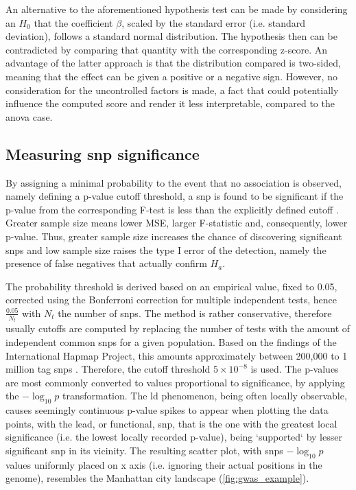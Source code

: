 An alternative to the aforementioned hypothesis test can be made by considering an $H_0$ that the coefficient $\beta$,  scaled by the standard error (i.e. standard deviation), follows a standard normal distribution. The hypothesis then can be contradicted by comparing that quantity with the corresponding z-score. An advantage of the latter approach is that the distribution compared is two-sided, meaning that the effect can be given a positive or a negative sign. However, no consideration for the uncontrolled factors is made, a fact that could potentially influence the computed score and render it less interpretable, compared to the \ac{anova} case.

\subsection{Measuring \ac{snp} significance}

By assigning a minimal probability to the event that no association is observed, namely defining a p-value cutoff threshold, a \ac{snp} is found to be significant if the p-value from the corresponding F-test is less than the explicitly defined cutoff \cite{AlejandroGonzalez-Chica2015}. Greater sample size means lower MSE, larger F-statistic and, consequently, lower p-value. Thus, greater sample size increases the chance of discovering significant \acp{snp} and low sample size raises the type I error of the detection, namely the presence of false negatives that actually confirm $H_a$.

The probability threshold is derived based on an empirical value, fixed to 0.05, corrected using the Bonferroni correction for multiple independent tests, hence $\frac{0.05}{N_t}$ with $N_t$ the number of \acp{snp}. The method is rather conservative, therefore usually cutoffs are computed by replacing the number of tests with the amount of independent common \acp{snp} for a given population. Based on the findings of the International Hapmap Project, this amounts approximately between 200,000 to 1 million tag \acp{snp} \cite{Belmont2003}. Therefore, the cutoff threshold $5\times 10 ^ {-8}$ is used. The p-values are most commonly converted to values proportional to significance, by applying the $-\log_{10}{p}$ transformation.   The \ac{ld} phenomenon, being often locally observable, causes seemingly continuous p-value spikes to appear when plotting the data points, with the lead, or functional, \ac{snp}, that is the one with the greatest local significance (i.e. the lowest locally recorded p-value), being `supported` by lesser significant \ac{snp} in its vicinity. The resulting scatter plot, with \acp{snp} $-\log_{10}{p}$ values uniformly placed on x axis (i.e. ignoring their actual positions in the genome), resembles the Manhattan city landscape (\autoref{fig:gwas_example}).

